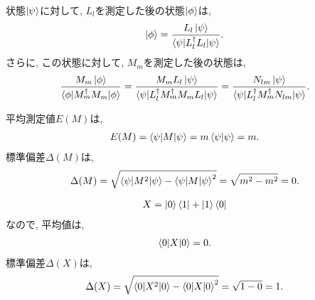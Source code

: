 \begin{ex}
    \label{ex2.57}
    状態$\ket{\psi}$に対して, $L_l$を測定した後の状態$\ket{\phi}$は,
    \begin{align*}
        \ket{\phi} = \frac{L_l \ket{\psi}}{\braket{\psi|L_l^\dagger L_l| \psi}}.
    \end{align*}
    さらに, この状態に対して, $M_m$を測定した後の状態は,
    \begin{align*}
        \frac{M_m \ket{\phi}}{\braket{\phi|M_m^\dagger M_m| \phi}}
        =
        \frac{M_m L_l \ket{\psi}}{\braket{\psi| L_l^\dagger M_m^\dagger M_m L_l| \psi}}
        =
        \frac{N_{lm} \ket{\psi}}{\braket{\psi| L_l^\dagger M_m^\dagger N_{lm}| \psi}}.
    \end{align*}
\end{ex}

\begin{ex}
    \label{ex2.58}
    平均測定値$E(M)$は,
    \begin{align*}
        E(M) = \braket{\psi| M |\psi} = m \braket{\psi | \psi} = m.
    \end{align*}
    標準偏差$\Delta(M)$は,
    \begin{align*}
        \Delta(M) = \sqrt{\braket{\psi| M^2 |\psi} - \braket{\psi| M |\psi}^2} = \sqrt{m^2 - m^2} = 0.
    \end{align*}
\end{ex}

\begin{ex}
    \label{ex2.59}
    \begin{align*}
        X = \ket{0}\bra{1} + \ket{1}\bra{0}
    \end{align*}
    なので,
    平均値は,
    \begin{align*}
        \braket{0|X|0} = 0.
    \end{align*}
    標準偏差$\Delta(X)$は,
    \begin{align*}
        \Delta(X)
        = \sqrt{\braket{0| X^2 |0} - \braket{0| X |0}^2}
        = \sqrt{1 - 0}
        = 1.
    \end{align*}
\end{ex}

